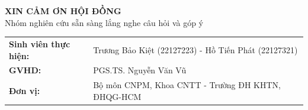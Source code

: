 \begin{frame}[plain]
  \centering
  \vfill
  {\Large\textbf{XIN CẢM ƠN HỘI ĐỒNG}}\\[0.3cm]
  {\normalsize Nhóm nghiên cứu sẵn sàng lắng nghe câu hỏi và góp ý}
  \vfill
  \footnotesize
  \begin{tabular}{ll}
    \textbf{Sinh viên thực hiện:} & Trương Bảo Kiệt (22127223) - Hồ Tiến Phát (22127321) \\
    \textbf{GVHD:} & PGS.TS. Nguyễn Văn Vũ \\
    \textbf{Đơn vị:} & Bộ môn CNPM, Khoa CNTT - Trường ĐH KHTN, ĐHQG-HCM
  \end{tabular}
  \vfill
\end{frame}


